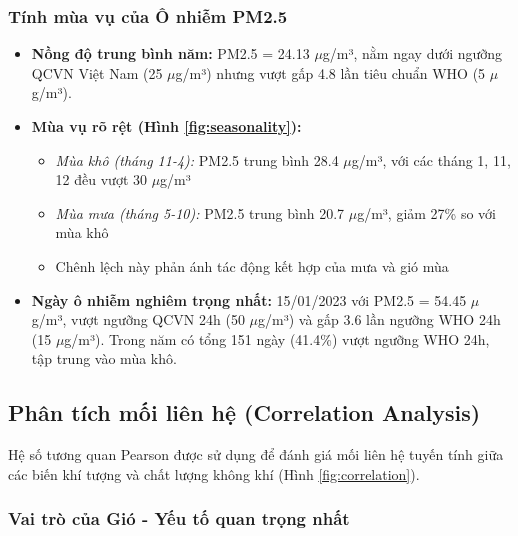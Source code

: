 \documentclass[12pt,a4paper]{article}
\begin{document}
\subsubsection{Tính mùa vụ của Ô nhiễm PM2.5}

\begin{itemize}
    \item \textbf{Nồng độ trung bình năm:} PM2.5 = 24.13 $\mu$g/m³, nằm ngay dưới ngưỡng QCVN Việt Nam (25 $\mu$g/m³) nhưng vượt gấp 4.8 lần tiêu chuẩn WHO (5 $\mu$g/m³).
    
    \item \textbf{Mùa vụ rõ rệt (Hình \ref{fig:seasonality}):} 
    \begin{itemize}
        \item \textit{Mùa khô (tháng 11-4):} PM2.5 trung bình 28.4 $\mu$g/m³, với các tháng 1, 11, 12 đều vượt 30 $\mu$g/m³
        \item \textit{Mùa mưa (tháng 5-10):} PM2.5 trung bình 20.7 $\mu$g/m³, giảm 27\% so với mùa khô
        \item Chênh lệch này phản ánh tác động kết hợp của mưa và gió mùa
    \end{itemize}
    
    \item \textbf{Ngày ô nhiễm nghiêm trọng nhất:} 15/01/2023 với PM2.5 = 54.45 $\mu$g/m³, vượt ngưỡng QCVN 24h (50 $\mu$g/m³) và gấp 3.6 lần ngưỡng WHO 24h (15 $\mu$g/m³). Trong năm có tổng 151 ngày (41.4\%) vượt ngưỡng WHO 24h, tập trung vào mùa khô.
\end{itemize}

\subsection{Phân tích mối liên hệ (Correlation Analysis)}

Hệ số tương quan Pearson được sử dụng để đánh giá mối liên hệ tuyến tính giữa các biến khí tượng và chất lượng không khí (Hình \ref{fig:correlation}).

\subsubsection{Vai trò của Gió - Yếu tố quan trọng nhất}
\end{document}
